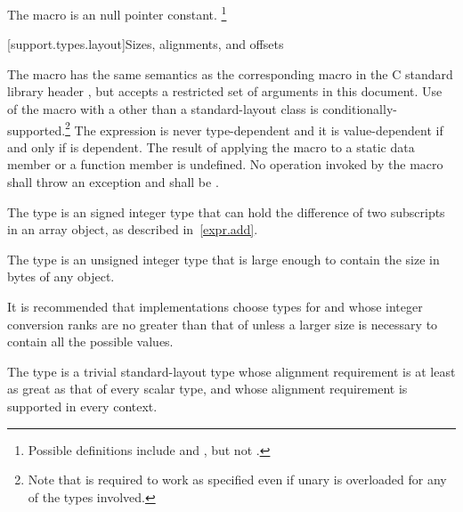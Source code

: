 \pnum
The macro
%
is an  null pointer constant.%
\footnote{Possible definitions include
and
,
but not
.}


[support.types.layout]{Sizes, alignments, and offsets}

\pnum
The macro
%
has the same semantics as the corresponding macro in
the C standard library header , but
accepts a restricted set of 
arguments in this document.
Use of the  macro with a 
other than a standard-layout class
is conditionally-supported.\footnote{Note that 
is required to work as specified even if unary
is overloaded for any of the types involved.}
The expression 
is never type-dependent and it is
value-dependent if and only if  is
dependent. The result of applying the  macro to
a static data member or a function member is undefined.
No operation invoked by the  macro shall throw an exception and
 shall be .

\pnum
The type  is an
signed integer type that can
hold the difference of two subscripts in an array object, as described in~\ref{expr.add}.

\pnum
The type  is an
unsigned integer type that is large enough
to contain the size in bytes of any object.

\pnum
\begin{note}
It is recommended that implementations choose types for  and 
whose integer conversion ranks are no greater than that of
 unless a larger size is necessary to contain all the possible values.
\end{note}

\pnum
The type
%
 is a trivial standard-layout type whose alignment requirement
is at least as great as that of every scalar type, and whose alignment
requirement is supported in every context.

